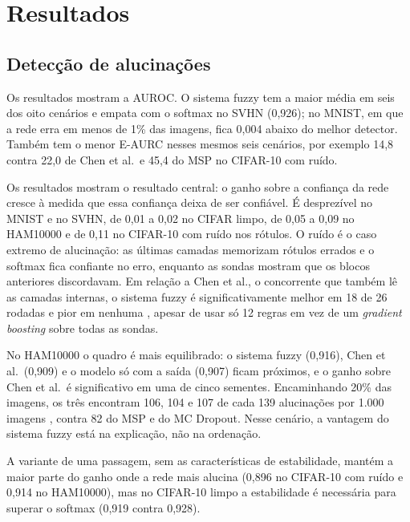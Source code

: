 \section{Resultados}


\subsection{Detecção de alucinações}
Os resultados mostram a AUROC. O sistema fuzzy tem a maior média em seis dos oito cenários e empata com o softmax no SVHN (0,926);
no MNIST, em que a rede erra em menos de 1\% das imagens, fica 0,004 abaixo do melhor detector. Também tem o menor E-AURC nesses mesmos seis
cenários, por exemplo 14,8 contra 22,0 de Chen et al.\ e 45,4 do MSP no CIFAR-10 com ruído.

Os resultados mostram o resultado central: o ganho sobre a confiança da rede cresce à medida que essa confiança deixa de ser
confiável. É desprezível no MNIST e no SVHN, de 0,01 a 0,02 no CIFAR limpo, de 0,05 a 0,09 no HAM10000 e de 0,11 no CIFAR-10 com ruído nos
rótulos. O ruído é o caso extremo de alucinação: as últimas camadas memorizam rótulos errados e o softmax fica confiante no erro, enquanto
as sondas mostram que os blocos anteriores discordavam. Em relação a Chen et al., o concorrente que também lê as camadas internas, o sistema
fuzzy é significativamente melhor em 18 de 26 rodadas e pior em nenhuma , apesar de usar só 12 regras em vez de um
\textit{gradient boosting} sobre todas as sondas.

No HAM10000 o quadro é mais equilibrado: o sistema fuzzy (0,916), Chen et al.\ (0,909) e o modelo só com a saída (0,907) ficam próximos, e o
ganho sobre Chen et al.\ é significativo em uma de cinco sementes. Encaminhando 20\% das imagens, os três encontram 106, 104 e 107 de cada 139
alucinações por 1.000 imagens , contra 82 do MSP e do MC Dropout. Nesse cenário, a vantagem do sistema fuzzy está
na explicação, não na ordenação.

A variante de uma passagem, sem as características de estabilidade, mantém a maior parte do ganho onde a rede mais alucina (0,896 no CIFAR-10
com ruído e 0,914 no HAM10000), mas no CIFAR-10 limpo a estabilidade é necessária para superar o softmax (0,919 contra 0,928).

